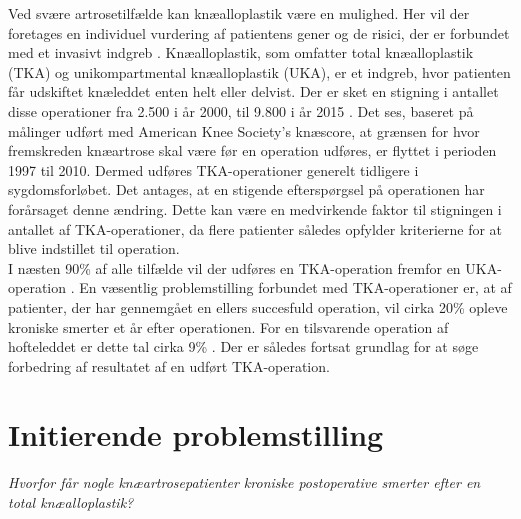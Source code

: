 Ved svære artrosetilfælde kan knæalloplastik være en mulighed. Her vil der foretages en individuel vurdering af patientens gener og de risici, der er forbundet med et invasivt indgreb \citep{schroder}. Knæalloplastik, som omfatter total knæalloplastik (TKA) og unikompartmental knæalloplastik (UKA), er et indgreb, hvor patienten får udskiftet knæleddet enten helt eller delvist. Der er sket en stigning i antallet disse operationer fra 2.500 i år 2000, til 9.800 i år 2015 \citep{aarsrapport2016}. Det ses, baseret på målinger udført med American Knee Society's knæscore, at grænsen for hvor fremskreden knæartrose skal være før en operation udføres, er flyttet i perioden 1997 til 2010. Dermed udføres TKA-operationer generelt tidligere i sygdomsforløbet. Det antages, at en stigende efterspørgsel på operationen har forårsaget denne ændring. \citep{aarsrapport2011} Dette kan være en medvirkende faktor til stigningen i antallet af TKA-operationer, da flere patienter således opfylder kriterierne for at blive indstillet til operation.\\
I næsten 90\% af alle tilfælde vil der udføres en TKA-operation fremfor en UKA-operation \citep{aarsrapport2016}. En væsentlig problemstilling forbundet med TKA-operationer er, at af patienter, der har gennemgået en ellers succesfuld operation, vil cirka 20\% opleve kroniske smerter et år efter operationen. For en tilsvarende operation af hofteleddet er dette tal cirka 9\% \citep{bezwick2012}. Der er således fortsat grundlag for at søge forbedring af resultatet af en udført TKA-operation.  

\section{Initierende problemstilling}
\begin{center}
		\textit{Hvorfor får nogle knæartrosepatienter kroniske postoperative smerter efter en total knæalloplastik?}
\end{center}

